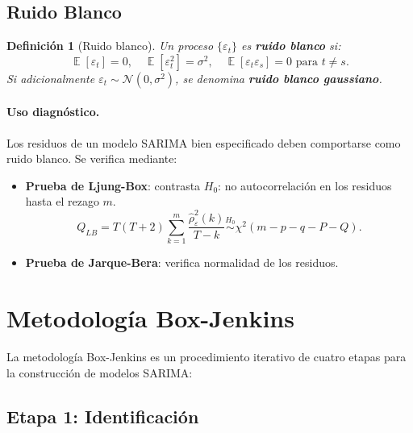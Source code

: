 \documentclass[12pt,a4paper]{article}
\newtheorem{definicion}{Definición}[section]
\DeclareMathOperator{\E}{\mathbb{E}}
\begin{document}
\subsection{Ruido Blanco}

\begin{definicion}[Ruido blanco]
Un proceso $\{\varepsilon_t\}$ es \textbf{ruido blanco} si:
\[
  \E[\varepsilon_t] = 0, \quad \E[\varepsilon_t^2] = \sigma^2, \quad \E[\varepsilon_t \varepsilon_s] = 0 \text{ para } t \neq s.
\]
Si adicionalmente $\varepsilon_t \sim \mathcal{N}(0, \sigma^2)$, se denomina \textbf{ruido blanco gaussiano}.
\end{definicion}

\paragraph{Uso diagnóstico.}
Los residuos de un modelo SARIMA bien especificado deben comportarse como ruido blanco.
Se verifica mediante:
\begin{itemize}
  \item \textbf{Prueba de Ljung-Box}: contrasta $H_0$: no autocorrelación en los residuos
        hasta el rezago $m$.
        \[
          Q_{LB} = T(T+2)\sum_{k=1}^{m}\frac{\hat{\rho}_\varepsilon^2(k)}{T-k} \overset{H_0}{\sim} \chi^2(m - p - q - P - Q).
        \]
  \item \textbf{Prueba de Jarque-Bera}: verifica normalidad de los residuos.
\end{itemize}

\section{Metodología Box-Jenkins}

La metodología Box-Jenkins es un procedimiento iterativo de cuatro etapas para la
construcción de modelos SARIMA:

\subsection{Etapa 1: Identificación}
\end{document}
